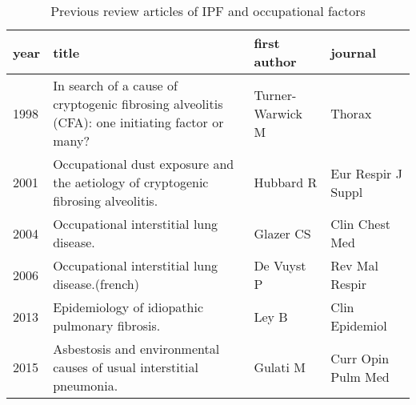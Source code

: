 \documentclass[a4paper,12pt]{article}
\begin{document}
\begin{table}
    \label{table:reviews}
    \begin{tabular}{lp{6cm}ll}
    \textbf{year} & \textbf{title} &       \textbf{first author} &            \textbf{journal} \\
    \midrule
    1998    &  In search of a cause of cryptogenic fibrosing alveolitis (CFA): one initiating factor or many? &  Turner-Warwick M &              Thorax \\
    2001    &               Occupational dust exposure and the aetiology of cryptogenic fibrosing alveolitis. &         Hubbard R &  Eur Respir J Suppl \\
    2004    &                                                         Occupational interstitial lung disease. &         Glazer CS &      Clin Chest Med \\
        2006    &                                                       Occupational interstitial lung disease.(french) &        De Vuyst P &      Rev Mal Respir \\
    2013    &                                                  Epidemiology of idiopathic pulmonary fibrosis. &             Ley B &      Clin Epidemiol \\
    2015    &                            Asbestosis and environmental causes of usual interstitial pneumonia. &          Gulati M &  Curr Opin Pulm Med \\
    \bottomrule
    \end{tabular}
    \caption{Previous review articles of IPF and occupational factors}
\end{table}
\end{document}
